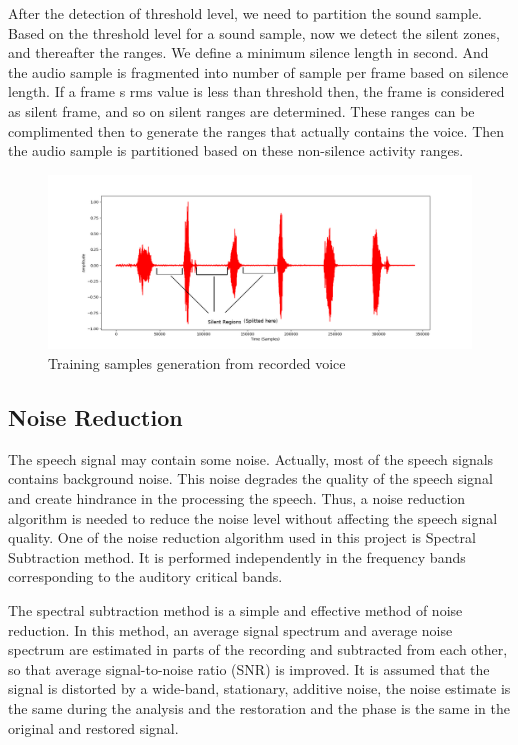 After the detection of threshold level, we need to partition the sound sample. Based on the threshold level for a sound sample, now we detect the silent zones, and thereafter the ranges. We define a minimum silence length in second. And the audio sample is fragmented into number of sample per frame based on silence length. If a frame \textquotesingle s rms value is less than threshold then, the frame is considered as silent frame, and so on silent ranges are determined. These ranges can be complimented then to generate the ranges that actually contains the voice. Then the audio sample is partitioned based on these non-silence activity ranges.
\begin{figure}[h]
	\begin{center}
		\includegraphics[width=6in]{images/sample.png}
		\caption{Training samples generation from recorded voice}
		\label{sample}
	\end{center}
\end{figure}

\subsection{Noise Reduction}

The speech signal may contain some noise. Actually, most of the speech signals contains background noise. This noise degrades the quality of the speech signal and create hindrance in the processing the speech. Thus, a noise reduction algorithm is needed to reduce the noise level without affecting the speech signal quality. One of the noise reduction algorithm used in this project is Spectral Subtraction method. It is performed independently in the frequency bands corresponding to the auditory critical bands.

The spectral subtraction method is a simple and effective method of noise reduction. In this method, an average signal spectrum and average noise spectrum are estimated in parts of the recording and subtracted from each other, so that average signal-to-noise ratio (SNR) is improved. It is assumed that the signal is distorted by a wide-band, stationary, additive noise, the noise estimate is the same during the analysis and the restoration and the phase is the same in the original and restored signal.

